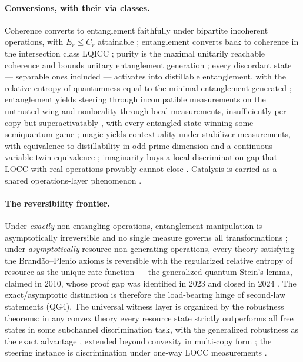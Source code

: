 \documentclass[11pt,a4paper]{article}
\theoremstyle{definition}
\begin{document}
\paragraph{Conversions, with their via classes.} Coherence converts to
entanglement faithfully under bipartite incoherent operations, with
$E_r \le C_r$ attainable \cite{streltsov2015}; entanglement converts back to
coherence in the intersection class LQICC \cite{chitambarhsieh2016}; purity
is the maximal unitarily reachable coherence and bounds unitary entanglement
generation \cite{streltsov2018njp}; every discordant state --- separable ones
included --- activates into distillable entanglement, with the relative
entropy of quantumness equal to the minimal entanglement generated
\cite{piani2011,streltsov2011}; entanglement yields steering through
incompatible measurements on the untrusted wing
\cite{wjd2007,quintino2014,uola2015} and nonlocality through local
measurements, insufficiently per copy \cite{werner1989,barrett2002} but
superactivatably \cite{palazuelos2012}, with every entangled state winning
some semiquantum game \cite{buscemi2012}; magic yields contextuality under
stabilizer measurements, with equivalence to distillability in odd prime
dimension \cite{howard2014} and a continuous-variable twin equivalence
\cite{booth2022,marieisert2012}; imaginarity buys a local-discrimination gap
that LOCC with real operations provably cannot close \cite{wu2021prl,wu2021pra}.
Catalysis is carried as a shared operations-layer phenomenon
\cite{jonathanplenio1999,aberg2014,datta2023}.

\paragraph{The reversibility frontier.} Under \emph{exactly} non-entangling
operations, entanglement manipulation is asymptotically irreversible and no
single measure governs all transformations \cite{lamiregula2023}; under
\emph{asymptotically} resource-non-generating operations, every theory
satisfying the Brand\~ao--Plenio axioms is reversible with the regularized
relative entropy of resource as the unique rate function --- the generalized
quantum Stein's lemma, claimed in 2010, whose proof gap was identified in
2023 \cite{berta2023} and closed in 2024
\cite{hayashiyamasaki2024,lami2024,brandaogour2015}. The exact/asymptotic
distinction is therefore the load-bearing hinge of second-law statements
(QG4). The universal witness layer is organized by the robustness theorems:
in any convex theory every resource state strictly outperforms all free
states in some subchannel discrimination task, with the generalized
robustness as the exact advantage
\cite{takagi2019,takagiregula2019,vidaltarrach1999}, extended beyond
convexity in multi-copy form \cite{kuroiwa2024}; the steering instance is
discrimination under one-way LOCC measurements \cite{pianiwatrous2015}.
\end{document}
